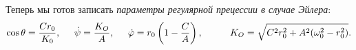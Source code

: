 Теперь мы готов записать \textit{параметры регулярной прецессии в случае Эйлера}:
\begin{equation}
\label{regp}
    \cos \theta = \frac{Cr_0}{K_0}, \hspace{0.5cm}
    \dot{\psi} = \frac{K_O}{A}, \hspace{0.5cm} 
    \dot{\varphi} = r_0 \left( 1- \frac{C}{A}  \right),
    \hspace{1cm} 
    K_O = \sqrt{C^2 r_0^2 + A^2 (\omega^2_0 - r_0^2)}.
\end{equation}
